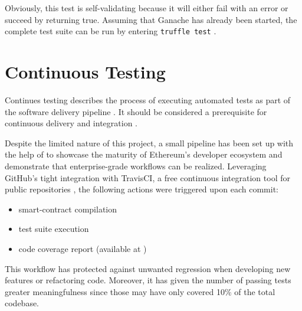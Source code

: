 Obviously, this test is self-validating because it will either fail with an error or succeed by returning true. Assuming that Ganache has already been started, the complete test suite can be run by entering \texttt{truffle test} \cite[Testing Your Contracts]{truffleSuite}. 

\pagebreak

\section{Continuous Testing}
Continues testing describes the process of executing automated tests as part of the software delivery pipeline \cite{pipeline}. It should be considered a prerequisite for continuous delivery and integration \cite{continousTestingInterview}.

Despite the limited nature of this project, a small pipeline has been set up with the help of \cite{testingSolidity} to showcase the maturity of Ethereum's developer ecosystem and demonstrate that enterprise-grade workflows can be realized. Leveraging GitHub's tight integration with TravisCI, a free continuous integration tool for public repositories \cite{travisCIGitHub}, the following actions were triggered upon each commit:

\begin{itemize}
  \item smart-contract compilation
  \item test suite execution
  \item code coverage report (available at \cite{coverageReport})
\end{itemize}

This workflow has protected against unwanted regression when developing new features or refactoring code. Moreover, it has given the number of passing tests greater meaningfulness since those may have only covered 10\% of the total codebase.
